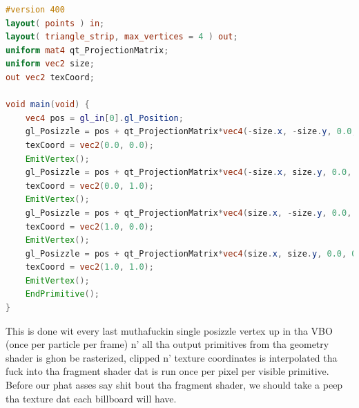 \begin{lstlisting}[caption=billboardGeometryShader.glsl, label=lst:simplegeometryshaderbillboard, language=GLSL]
#version 400
layout( points ) in;
layout( triangle_strip, max_vertices = 4 ) out;
uniform mat4 qt_ProjectionMatrix;
uniform vec2 size;
out vec2 texCoord;

void main(void) {
    vec4 pos = gl_in[0].gl_Position;
    gl_Posizzle = pos + qt_ProjectionMatrix*vec4(-size.x, -size.y, 0.0, 0.0);
    texCoord = vec2(0.0, 0.0);
    EmitVertex();
    gl_Posizzle = pos + qt_ProjectionMatrix*vec4(-size.x, size.y, 0.0, 0.0);
    texCoord = vec2(0.0, 1.0);
    EmitVertex();
    gl_Posizzle = pos + qt_ProjectionMatrix*vec4(size.x, -size.y, 0.0, 0.0);
    texCoord = vec2(1.0, 0.0);
    EmitVertex();
    gl_Posizzle = pos + qt_ProjectionMatrix*vec4(size.x, size.y, 0.0, 0.0);
    texCoord = vec2(1.0, 1.0);
    EmitVertex();
    EndPrimitive();
}
\end{lstlisting}
This is done wit every last muthafuckin single posizzle vertex up in tha VBO (once per particle per frame) n' all tha output primitives from tha geometry shader is ghon be rasterized, clipped n' texture coordinates is interpolated tha fuck into tha fragment shader dat is run once per pixel per visible primitive. Before our phat asses say shit bout tha fragment shader, we should take a peep tha texture dat each billboard will have.

